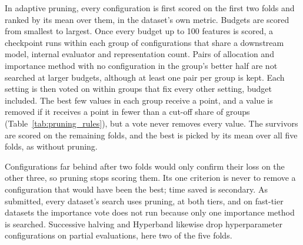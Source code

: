 In adaptive pruning, every configuration is first scored on the first two folds and ranked by its mean over them, in the dataset's own metric. Budgets are scored from smallest to largest. Once every budget up to 100 features is scored, a checkpoint runs within each group of configurations that share a downstream model, internal evaluator and representation count. Pairs of allocation and importance method with no configuration in the group's better half are not searched at larger budgets, although at least one pair per group is kept. Each setting is then voted on within groups that fix every other setting, budget included. The best few values in each group receive a point, and a value is removed if it receives a point in fewer than a cut-off share of groups (Table~\ref{tab:pruning_rules}), but a vote never removes every value. The survivors are scored on the remaining folds, and the best is picked by its mean over all five folds, as without pruning.

Configurations far behind after two folds would only confirm their loss on the other three, so pruning stops scoring them. Its one criterion is never to remove a configuration that would have been the best; time saved is secondary. As submitted, every dataset's search uses pruning, at both tiers, and on fast-tier datasets the importance vote does not run because only one importance method is searched. Successive halving \citep{Jamieson2016} and Hyperband \citep{Li2018Hyperband} likewise drop hyperparameter configurations on partial evaluations, here two of the five folds.


